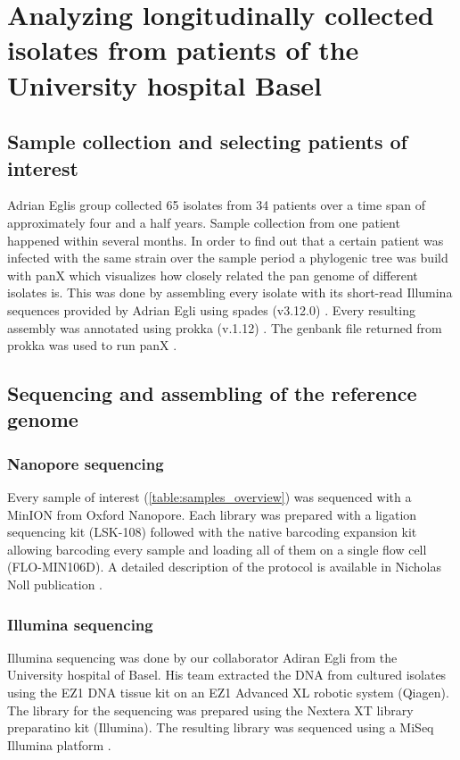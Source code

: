 \section{Analyzing longitudinally collected isolates from patients of the University hospital Basel}
\subsection{Sample collection and selecting patients of interest}
Adrian Eglis group collected 65 isolates from 34 patients over a time span of approximately four and a half years.
Sample collection from one patient happened within several months. In order to find out that a certain patient was infected with the same strain over the sample period a phylogenic tree was build with panX which visualizes how closely related the pan genome of different isolates is. This was done by assembling every isolate with its short-read Illumina sequences provided by Adrian Egli using spades (v3.12.0) \cite{spades}.
Every resulting assembly was annotated using prokka (v.1.12) \cite{prokka}. The genbank file returned from prokka was used to run panX \cite{panx}. 

\subsection{Sequencing and assembling of the reference genome}
\label{section:reference_genome}
\subsubsection{Nanopore sequencing}
Every sample of interest (\ref{table:samples_overview}) was sequenced with a MinION from Oxford Nanopore. Each library was prepared with a ligation sequencing kit (LSK-108) followed with the native barcoding expansion kit allowing barcoding every sample and loading all of them on a single flow cell (FLO-MIN106D). A detailed description of the protocol is available in Nicholas Noll publication \cite{nanopore}.

\subsubsection{Illumina sequencing}
Illumina sequencing was done by our collaborator Adiran Egli from the University hospital of Basel. His team extracted the DNA from cultured isolates using the EZ1 DNA tissue kit on an EZ1 Advanced XL robotic system (Qiagen). The library for the sequencing was prepared using the Nextera XT library preparatino kit (Illumina). The resulting library was sequenced using a MiSeq Illumina platform \cite{nanopore}.

